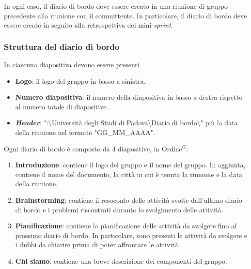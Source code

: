 In ogni caso, il diario di bordo deve essere creato in una riunione di gruppo
precedente alla riunione con il committente. In particolare, il diario di bordo
deve essere creato in seguito alla retrospettiva del mini-\textit{sprint}.

\subsubsection{Struttura del diario di bordo}

In ciascuna diapositiva devono essere presenti
\begin{itemize}
	\item \textbf{Logo}: il logo del gruppo in basso a sinistra.
	\item \textbf{Numero diapositiva}: il numero della diapositiva in basso a
	      destra rispetto al numero totale di diapositive.
	\item \textbf{\textit{Header}}: ":\textbackslash{}Università
	      degli Studi di Padova\textbackslash{}Diario di bordo\textbackslash{}"
	      più la data della riunione nel formato "GG\_MM\_AAAA".
\end{itemize}

Ogni diario di bordo è composto da 4 diapositive, in \gls{Ordine}$^G$:
\begin{enumerate}
	\item \textbf{Introduzione}: contiene il logo del gruppo e il nome del
	      gruppo. In aggiunta, contiene il nome del documento, la città in cui è
	      tenuta la riunione e la data della riunione.

	\item \textbf{Brainstorming}: contiene il resoconto delle attività svolte
	      dall'ultimo diario di bordo e i problemi riscontrati duranto lo
	      svolgimento delle attività.

	\item \textbf{Pianificazione}: contiene la pianificazione delle attività
	      da svolgere fino al prossimo diario di bordo. In particolare, sono
	      presenti le attività da svolgere e i dubbi da chiarire prima di poter
	      affrontare le attività.

	\item \textbf{Chi siamo}: contiene una breve descrizione dei componenti
	      del gruppo.
\end{enumerate}

